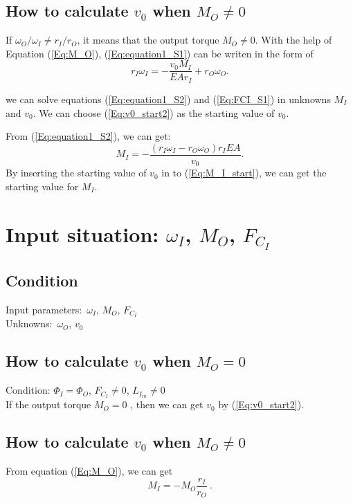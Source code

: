 \documentclass[a4paper,fleqn,13pt]{article}
\begin{document}
\subsection{How to calculate $v_0$ when $M_O \not = 0$ }
If $\omega_O / \omega_I \neq r_I/r_O$, it means that the output torque $M_O \neq 0$. With the help of Equation (\ref{Eq:M_O}), (\ref{Eq:equation1_S1}) can be
writen in the form of 
\begin{equation}  \label{Eq:equation1_S2}
 r_I \omega_I = -\frac{v_0 M_I}{E A r_I} + r_O \omega_O.
\end{equation}

we can solve equations (\ref{Eq:equation1_S2}) and (\ref{Eq:FCI_S1}) in unknowns $M_I$ and $v_0$. We can choose (\ref{Eq:v0_start2}) as the starting value of $v_0$.

From (\ref{Eq:equation1_S2}), we can get:
\begin{equation} \label{Eq:M_I_start}
  M_I = - \frac{(r_I \omega_I - r_O \omega_O)r_I E A }{v_0}.
\end{equation}
By inserting the starting value of $v_0$ in to (\ref{Eq:M_I_start}), we can get the starting value for $M_I$.




\section{Input situation: $\omega_I$, $M_O$, $F_{C_I}$}

\subsection{Condition}
Input parameters:\ $\omega_I$, $M_O$, $F_{C_I}$ \\
Unknowns:\ $\omega_O$, $v_0$

\subsection{How to calculate $v_0$ when $M_O = 0$}
Condition: $\Phi_I=\Phi_O$, $F_{C_I} \not = 0$, $L_{I_{in}} \neq 0$  \\

If the output torque $M_O = 0$ , then we can get $v_0$ by (\ref{Eq:v0_start2}).

\subsection{How to calculate $v_0$ when $M_O \not = 0$ }
From equation (\ref{Eq:M_O}), we can get
\begin{equation} \label{Eq:M_I}
 M_I = - M_O \frac{r_I}{r_O} \ .
\end{equation}
\end{document}
